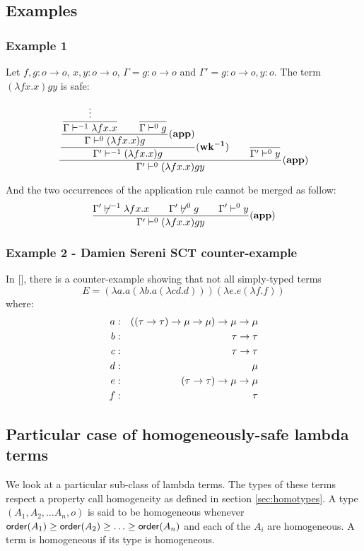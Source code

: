 \subsection{Examples}
\subsubsection{Example 1}
Let $f,g:o\rightarrow o$, $x,y:o\rightarrow
o$, $\Gamma = g:o\rightarrow o$ and $\Gamma' = g:o\rightarrow o,
y:o$. The term $(\lambda f x . x) g y $ is safe:


$$ \frac{\displaystyle 
        \frac{\displaystyle 
            \frac{\displaystyle 
                \frac{\displaystyle \vdots}{\Gamma \vdash^{-1} \lambda f x. x}      \qquad \frac{\displaystyle}{\Gamma \vdash^0 g} }{\Gamma \vdash^0 (\lambda f x. x) g} \mathbf{(app)}
        }{ \Gamma' \vdash^{-1} (\lambda f x. x) g } \mathbf{(wk^{-1})}
        \qquad \frac{\displaystyle}{\Gamma' \vdash^0 y}
    }{ \Gamma' \vdash^0 (\lambda f x. x) g y } \mathbf{(app)}
$$


And the two occurrences of the application rule cannot be merged as
follow:
$$ \frac{\displaystyle {\Gamma' \not\vdash^{-1} \lambda f x. x} \qquad \Gamma' \not\vdash^0 g \qquad \Gamma' \vdash^0 y}{\Gamma' \vdash^0 (\lambda f x. x) g y } \mathbf{(app)}$$

\subsubsection{Example 2 - Damien Sereni SCT counter-example}
In [], there is a counter-example showing that not all simply-typed terms
$$ E =  (\lambda a . a (\lambda b . a (\lambda c d .d))) (\lambda e . e (\lambda f .f))$$
where:
\begin{eqnarray*}
a &:& ((\tau \rightarrow \tau) \rightarrow \mu \rightarrow \mu) \rightarrow \mu \rightarrow \mu \\
b &:& \tau \rightarrow \tau \\
c &:& \tau \rightarrow \tau \\
d &:& \mu \\
e &:& (\tau \rightarrow \tau) \rightarrow \mu \rightarrow \mu \\
f &:& \tau
\end{eqnarray*}

\subsection{Particular case of homogeneously-safe lambda terms}

We look at a particular sub-class of lambda terms. The types of
these terms respect a property call homogeneity as defined in
section \ref{sec:homotypes}. A type $(A_1, A_2, \ldots A_n, o)$ is
said to be homogeneous whenever ${\sf order}(A_1) \geq {\sf order}(A_2) \geq
\ldots \geq  {\sf order}(A_n)$ and each of the $A_i$ are homogeneous. A
term is homogeneous if its type is homogeneous.



